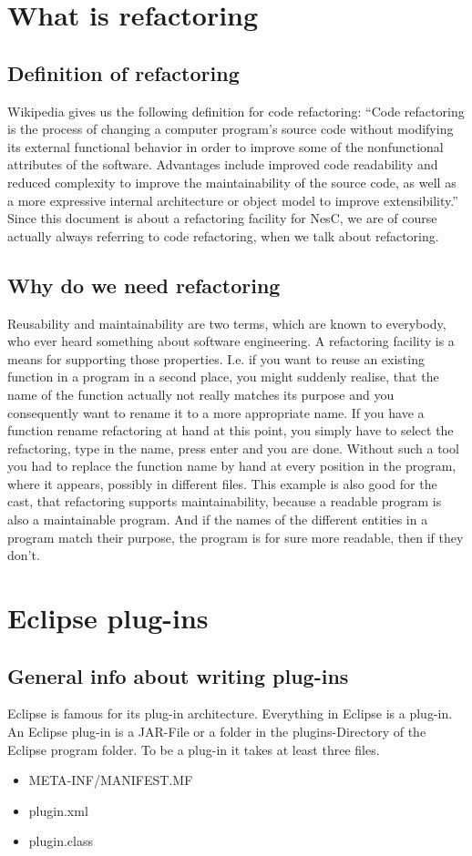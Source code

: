 \documentclass[a4paper,10pt]{report}
\begin{document}
\tableofcontents

\part{What is refactoring}
\chapter{Definition of refactoring}
Wikipedia gives us the following definition for code refactoring:
``Code refactoring is the process of changing a computer program's source code without modifying its external functional behavior in order to improve some of the nonfunctional attributes of the software. 
Advantages include improved code readability  and reduced complexity to improve the maintainability of the source code, as well as a more expressive internal architecture or object model to improve extensibility.''
Since this document is about a refactoring facility for NesC, we are of course actually always referring to code refactoring, when we talk about refactoring.

\chapter{Why do we need refactoring}
Reusability and maintainability are two terms, which are known to everybody, who ever heard something about software engineering. 
A refactoring facility is a means for supporting those properties. I.e. if you want to reuse an existing function in a program in a second place,
you might suddenly realise, that the name of the function actually not really matches its purpose and you consequently want to rename it to a more appropriate name.
If you have a function rename refactoring at hand at this point, you simply have to select the refactoring, type in the name, press enter and you are done. 
Without such a tool you had to replace the function name by hand at every position in the program, where it appears, possibly in different files.
This example is also good for the cast, that refactoring supports maintainability, because a readable program is also a maintainable program. 
And if the names of the different entities in a program match their purpose, the program is for sure more readable, then if they don't.

\part{Eclipse plug-ins}
\chapter{General info about writing plug-ins}
Eclipse is famous for its plug-in architecture. Everything in Eclipse is a plug-in. An Eclipse plug-in is a JAR-File or a folder in the plugins-Directory of the Eclipse program folder.
To be a plug-in it takes at least three files.
\begin{itemize}
  \item META-INF/MANIFEST.MF
  \item plugin.xml
  \item plugin.class
\end{itemize}
\end{document}
